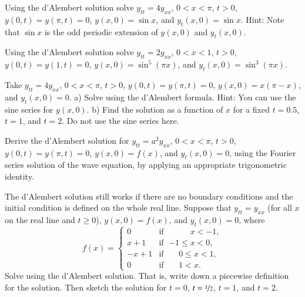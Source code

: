 \documentclass[12pt]{book}
\begin{document}
\begin{exercise}
Using the d'Alembert solution solve $y_{tt} = 4y_{xx}$, $0 < x < \pi$, $t >
0$,
$y(0,t) = y(\pi, t) = 0$, $y(x,0) = \sin x$, and
$y_t(x,0) = \sin x$.  Hint: Note that $\sin x$ is the odd periodic extension of
$y(x,0)$ and $y_t(x,0)$.
\end{exercise}

\begin{exercise}
Using the d'Alembert solution solve $y_{tt} = 2y_{xx}$, $0 < x < 1$, $t > 0$,
$y(0,t) = y(1, t) = 0$, $y(x,0) = \sin^5 (\pi x)$, and
$y_t(x,0) = \sin^3 (\pi x)$.
\end{exercise}

\begin{exercise}
Take
$y_{tt} = 4y_{xx}$, $0 < x < \pi$, $t > 0$,
$y(0,t) = y(\pi, t) = 0$, $y(x,0) = x(\pi-x)$, and
$y_t(x,0) = 0$.
a) Solve using the d'Alembert formula.  Hint: You can use the sine series
for $y(x,0)$.
b) Find the solution as a function of $x$ for a fixed $t=0.5$, $t=1$, and
$t=2$.  Do not use the sine series here.
\end{exercise}

\begin{exercise}
Derive the d'Alembert solution for $y_{tt} = a^2 y_{xx}$, $0 < x < \pi$, $t >
0$,
$y(0,t) = y(\pi, t) = 0$, $y(x,0) = f(x)$, and
$y_t(x,0) = 0$, using the Fourier series solution of the wave equation,
by applying an appropriate trigonometric identity.
\end{exercise}

\begin{exercise}
The d'Alembert solution still works if there are no boundary conditions and
the initial condition is defined on the whole real line.  Suppose that
$y_{tt} = y_{xx}$ (for all $x$ on the real line and $t \geq 0$),
$y(x,0) = f(x)$, and
$y_t(x,0) = 0$, where
\begin{equation*}
f(x) =
\begin{cases}
0 & \text{if } \; \phantom{{-1} \leq {} }x < -1, \\
x+1 & \text{if } \; {-1} \leq x < 0, \\
-x+1 & \text{if } \; \phantom{-}0 \leq x < 1, \\
0 & \text{if } \; \phantom{-}1 < x .
\end{cases}
\end{equation*}
Solve using the d'Alembert solution. That is, write down a piecewise
definition for the solution.  Then sketch the solution for $t=0$,
$t=\nicefrac{1}{2}$, $t=1$, and $t=2$.
\end{exercise}
\end{document}
